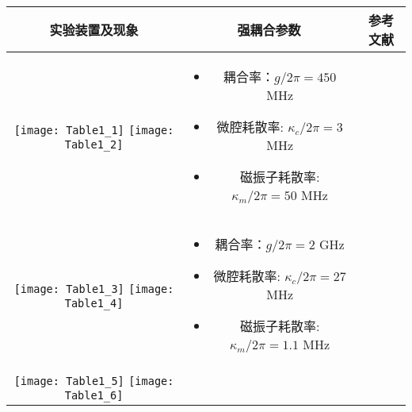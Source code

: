 \begin{center}
	\label{ExperimentsTable}
	\begin{tabular}{ccc}
		\toprule
		实验装置及现象 & 强耦合参数 & 参考文献 \\
		\midrule
		\begin{minipage}[m]{.3\textwidth}\centering\vspace*{5pt}
			\texttt{[image: Table1\_1]}
			\texttt{[image: Table1\_2]}\vspace*{5pt}
		\end{minipage} &
		\begin{minipage}[m]{.5\textwidth}
			\begin{itemize}
				\item 耦合率：$g/2\pi=450$ MHz
				\item 微腔耗散率: $\kappa_c /2\pi=3$ MHz
				\item 磁振子耗散率: $\kappa_m /2\pi=50$ MHz
			\end{itemize}
		\end{minipage} &
		\parencite{PhysRevLett.111.127003Huebl} \\
		\hline
		\begin{minipage}[m]{.3\textwidth}\centering\vspace*{5pt}
			\texttt{[image: Table1\_3]}
			\texttt{[image: Table1\_4]}\vspace*{5pt}
		\end{minipage} &
		\begin{minipage}[m]{.5\textwidth}
			\begin{itemize}
				\item 耦合率：$g/2\pi=2$ GHz
				\item 微腔耗散率: $\kappa_c /2\pi=27$ MHz
				\item 磁振子耗散率: $\kappa_m /2\pi=1.1$ MHz
			\end{itemize}
		\end{minipage} &
		\parencite{PhysRevApplied.2.054002Tobar} \\
		\hline
		\begin{minipage}[m]{.3\textwidth}\centering\vspace*{5pt}
			\quad\texttt{[image: Table1\_5]}
			\texttt{[image: Table1\_6]}\vspace*{5pt}
		\end{minipage} &
		\begin{minipage}[m]{.5\textwidth}

\end{minipage}
\end{tabular}
\end{center}
